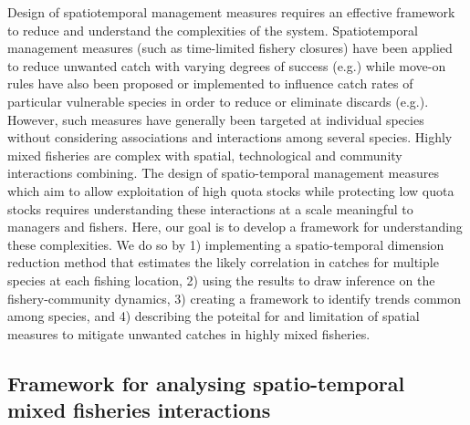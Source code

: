 \documentclass[fleqn,10pt]{wlscirep}
\begin{document}
\begin{linenumbers}
Design of spatiotemporal management measures requires an effective framework to
reduce and understand the complexities of the system. Spatiotemporal management
measures (such as time-limited fishery closures) have been applied to reduce
unwanted catch with varying degrees of success (e.g.\cite{Needle2011,
	Holmes2011, Beare2010, Dinmore2003}) while move-on rules have also been
proposed or implemented to influence catch rates of particular vulnerable
species in order to reduce or eliminate discards (e.g.\cite{Gardner2008,
	Dunn2011, Dunn2014a}). However, such measures have generally been
targeted at individual species without considering associations and
interactions among several species. Highly mixed fisheries are complex with
spatial, technological and community interactions combining. The design of
spatio-temporal management measures which aim to allow exploitation of high
quota stocks while protecting low quota stocks requires understanding these
interactions at a scale meaningful to managers and fishers. Here, our goal is
to develop a framework for understanding these complexities. We do so by
1) implementing a spatio-temporal dimension reduction method that estimates the
likely correlation in catches for multiple species at each fishing location, 2)
using the results to draw inference on the fishery-community dynamics, 3)
creating a framework to identify trends common among species, and 4)
describing the poteital for and limitation of spatial measures to mitigate
unwanted catches in highly mixed fisheries.\\

\subsection*{Framework for analysing spatio-temporal mixed fisheries
	interactions \\}


\end{linenumbers}
\end{document}
